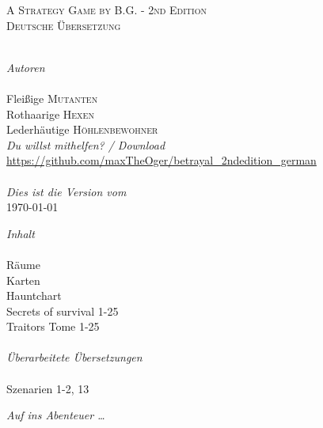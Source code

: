 \begin{titlepage}
\begin{center}
\textsc{A Strategy Game by B.G. - 2nd Edition}\\[1.5cm]

\textsc{\Large Deutsche Übersetzung}\\[0.5cm]



\HRule \\[1.5cm]

\begin{minipage}{0.4\textwidth}
\begin{flushleft} \large
\emph{Autoren}\\
\\[0.3cm]
Fleißige \textsc{Mutanten}\\
Rothaarige \textsc{Hexen}\\
Lederhäutige \textsc{Höhlenbewohner}
\\[1.5cm]
\emph{Du willst mithelfen? / Download}
\\[0.3cm]
\url{https://github.com/maxTheOger/betrayal\_2ndedition\_german}\\
\\[1.5cm]
\emph{Dies ist die Version vom}
\\[0.3cm]
{\large \today}


\end{flushleft}
\end{minipage}
\hfill
\begin{minipage}{0.4\textwidth}
\begin{flushright} \large
\emph{Inhalt} \\
\\[0.3cm]
Räume \\
Karten \\
Hauntchart \\
Secrets of survival 1-25 \\
Traitors Tome 1-25 \\
\\[1.5cm]
\emph{Überarbeitete Übersetzungen}\\
\\[0.3cm]
Szenarien 1-2, 13
\end{flushright}
\end{minipage}

\vfill

{\emph{Auf ins Abenteuer …}}

\end{center}

\end{titlepage}